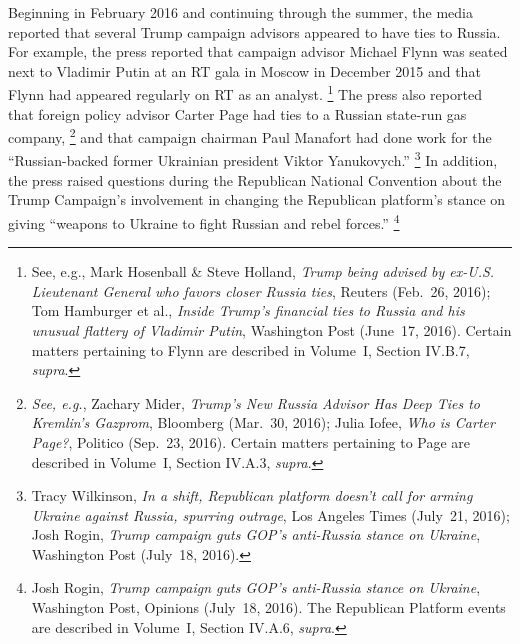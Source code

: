 Beginning in February 2016 and continuing through the summer, the media reported that several Trump campaign advisors appeared to have ties to Russia.
For example, the press reported that campaign advisor Michael Flynn was seated next to Vladimir Putin at an RT gala in Moscow in December 2015 and that Flynn had appeared regularly on RT as an analyst.%
\footnote{See, e.g., Mark Hosenball \& Steve Holland, \textit{Trump being advised by ex-U.S. Lieutenant General who favors closer Russia ties}, Reuters (Feb.~26, 2016);
Tom Hamburger et al., \textit{Inside Trump's financial ties to Russia and his unusual flattery of Vladimir Putin}, Washington Post (June~17, 2016).
Certain matters pertaining to Flynn are described in Volume~I, Section IV.B.7, \textit{supra}.}
The press also reported that foreign policy advisor Carter Page had ties to a Russian state-run gas company,%
\footnote{\textit{See, e.g.}, Zachary Mider, \textit{Trump's New Russia Advisor Has Deep Ties to Kremlin's Gazprom}, Bloomberg (Mar.~30, 2016);
Julia Iofee, \textit{Who is Carter Page?}, Politico (Sep.~23, 2016).
Certain matters pertaining to Page are described in Volume~I, Section IV.A.3, \textit{supra}.}
and that campaign chairman Paul Manafort had done work for the ``Russian-backed former Ukrainian president Viktor Yanukovych.''%
\footnote{Tracy Wilkinson, \textit{In a shift, Republican platform doesn't call for arming Ukraine against Russia, spurring outrage}, Los Angeles Times (July~21, 2016);
Josh Rogin, \textit{Trump campaign guts GOP's anti-Russia stance on Ukraine}, Washington Post (July~18, 2016).}
In addition, the press raised questions during the Republican National Convention about the Trump Campaign's involvement in changing the Republican platform's stance on giving ``weapons to Ukraine to fight Russian and rebel forces.''%
\footnote{Josh Rogin, \textit{Trump campaign guts GOP's anti-Russia stance on Ukraine}, Washington Post, Opinions (July~18, 2016).
The Republican Platform events are described in Volume~I, Section IV.A.6, \textit{supra}.}

